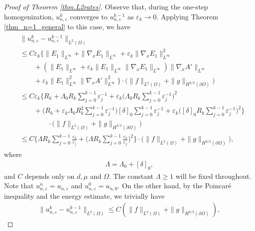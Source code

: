 \documentclass[reqno,12pt]{amsart} %
\theoremstyle{definition}
\theoremstyle{remark}
\numberwithin{equation}{section}
\begin{document}
\begin{proof}[Proof of Theorem \ref{thm.L2rates}]
  Observe that, during the one-step homogenization, $u_{n, \varepsilon}^k$ converges to $u_{n, \varepsilon}^{k-1}$ as $\varepsilon_k\rightarrow 0$. Applying Theorem \ref{thm_n=1_general} to this case, we have
  \begin{align}\label{conver_es_unk}
    \begin{split}
      &\|u_{n, \varepsilon}^k-u_{n, \varepsilon}^{k-1}\|_{L^2(\Omega)} \\
      & \leq C\varepsilon_k \Big\{ \|E_1\|_{L^\infty}+\|\nabla_xE_1\|_{L^\infty}+\varepsilon_k\|\nabla_xE_1\|_{L^\infty}^2\\
      &\qquad +(\|E_1\|_{L^\infty}+\varepsilon_k\|E_1\|_{L^\infty}\|\nabla_xE_1\|_{L^\infty})\|\nabla_xA'\|_{L^\infty}\\
      &\qquad + \varepsilon_k \|E_1\|_{L^\infty}^2\|\nabla_xA'\|_{L^\infty}^2 \Big\} \cdot\Big(\|f\|_{L^2(\Omega)}+\|g\|_{H^{3/2}(\partial\Omega)}\Big)\\
      &\leq C\varepsilon_k\bigg\{R_k+\Lambda_0 R_k\sum_{j=0}^{k-1}\varepsilon_j^{-1}+\varepsilon_k\bigg(\Lambda_0 R_k\sum_{j=0}^{k-1}\varepsilon_j^{-1}\bigg)^2 \\ & \qquad  +\bigg(R_k+\varepsilon_k\Lambda_0 R_k^2 \sum_{j=0}^{k-1}\varepsilon_j^{-1}\bigg)[\delta]_0\sum_{j=0}^{k-1}\varepsilon_j^{-1} + \varepsilon_k\bigg([\delta]_0 R_k\sum_{j=0}^{k-1}\varepsilon_j^{-1}\bigg)^2\bigg\}\\
      & \qquad \qquad \cdot \Big(\|f\|_{L^2(\Omega)}+\|g\|_{H^{3/2}(\partial\Omega)}\Big) \\ 
      &\leq C\bigg\{\Lambda R_k\sum_{j=0}^{k-1}\frac{\varepsilon_k}{\varepsilon_j}+\bigg(\Lambda R_k\sum_{j=0}^{k-1}\frac{\varepsilon_k}{\varepsilon_j}\bigg)^2\bigg\}\cdot\Big(\|f\|_{L^2(\Omega)}+\|g\|_{H^{3/2}(\partial\Omega)}\Big),
    \end{split}
  \end{align}
  where
  \begin{align}\label{def.Lambda}
    \Lambda=\Lambda_0+[\delta]_0,
  \end{align}
and $C$ depends only on $d, \mu $ and $\Omega$. The constant $\Lambda \ge 1$ will be fixed throughout. Note that $u_{n, \varepsilon}^n=u_{n, \varepsilon}$ and $u_{n, \varepsilon}^0=u_{n, 0}$. On the other hand, by the Poincar\'{e} inequality and the energy estimate, we trivially have
\begin{align}\label{conver_es_unk_energy}
\|u_{n, \varepsilon}^k-u_{n, \varepsilon}^{k-1}\|_{L^2(\Omega)} \leq C (\|f\|_{L^2(\Omega)}+\|g\|_{H^{3/2}(\partial\Omega)}),

\end{align}
\end{proof}
\end{document}
